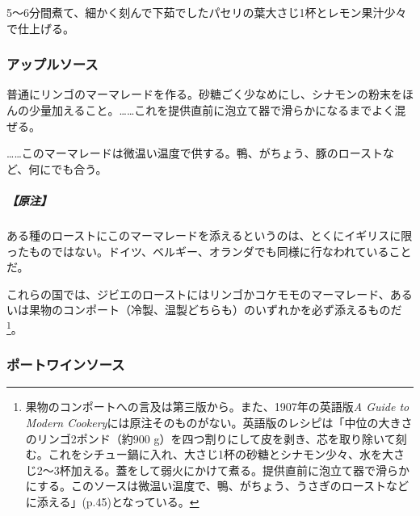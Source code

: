 \begin{recette}
5〜6分間煮て、細かく刻んで下茹でしたパセリの葉大さじ1杯とレモン果汁少々で仕上げる。

\hypertarget{apple-sauce}{%
\subsubsection{アップルソース}\label{apple-sauce}}



普通にリンゴのマーマレードを作る。砂糖ごく少なめにし、シナモンの粉末をほんの少量加えること。\ldots{}\ldots{}これを提供直前に泡立て器で滑らかになるまでよく混ぜる。

\ldots{}\ldots{}このマーマレードは微温い温度で供する。鴨、がちょう、豚のローストなど、何にでも合う。

\hypertarget{nota-apple-sauce}{%
\subparagraph{【原注】}\label{nota-apple-sauce}}

ある種のローストにこのマーマレードを添えるというのは、とくにイギリスに限ったものではない。ドイツ、ベルギー、オランダでも同様に行なわれていることだ。

これらの国では、ジビエのローストにはリンゴかコケモモのマーマレード、あるいは果物のコンポート（冷製、温製どちらも）のいずれかを必ず添えるものだ\footnote{果物のコンポートへの言及は第三版から。また、1907年の英語版\emph{A
  Guide to Modern
  Cookery}には原注そのものがない。英語版のレシピは「中位の大きさのリンゴ2ポンド（約900
  g）を四つ割りにして皮を剥き、芯を取り除いて刻む。これをシチュー鍋に入れ、大さじ1杯の砂糖とシナモン少々、水を大さじ2〜3杯加える。蓋をして弱火にかけて煮る。提供直前に泡立て器で滑らかにする。このソースは微温い温度で、鴨、がちょう、うさぎのローストなどに添える」(p.45)となっている。}。

\hypertarget{porto-wine-sauce}{%
\subsubsection{ポートワインソース}\label{porto-wine-sauce}}



\end{recette}

